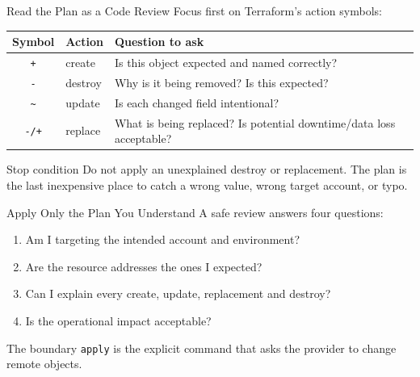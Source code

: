 \documentclass[aspectratio=169, xcolor=table]{beamer}
\begin{document}
\begin{frame}{Read the Plan as a Code Review}
  Focus first on Terraform's action symbols:

  \vspace{0.5em}
  \begin{center}
    \begin{tabular}{c l p{}}
      \toprule
      \textbf{Symbol} & \textbf{Action} & \textbf{Question to ask} \\
      \midrule
      \textcolor{SecondaryAccent}{\texttt{+}} & create & Is this object expected and named correctly? \\
      \textcolor{AlertColor}{\texttt{-}} & destroy & Why is it being removed? Is this expected?  \\
      \textcolor{PrimaryAccent}{\texttt{\textasciitilde}} & update & Is each changed field intentional? \\
      \textcolor{AlertColor}{\texttt{-/+}} & replace & What is being replaced? Is potential downtime/data loss acceptable? \\
      \bottomrule
    \end{tabular}
  \end{center}

  \vspace{0.5em}
  \begin{alertblock}{Stop condition}
    Do not apply an unexplained destroy or replacement. The plan is the last inexpensive
    place to catch a wrong value, wrong target account, or typo.
  \end{alertblock}
\end{frame}

\begin{frame}{Apply Only the Plan You Understand}
  A safe review answers four questions:

  \vspace{0.5em}
  \begin{enumerate}
    \item Am I targeting the intended account and environment?
    \item Are the resource addresses the ones I expected?
    \item Can I explain every create, update, replacement and destroy?
    \item Is the operational impact acceptable?
  \end{enumerate}

  \vspace{0.8em}
  \begin{block}{The boundary}
    \texttt{apply} is the explicit command that asks the provider to change remote objects.
  \end{block}
\end{frame}
\end{document}
